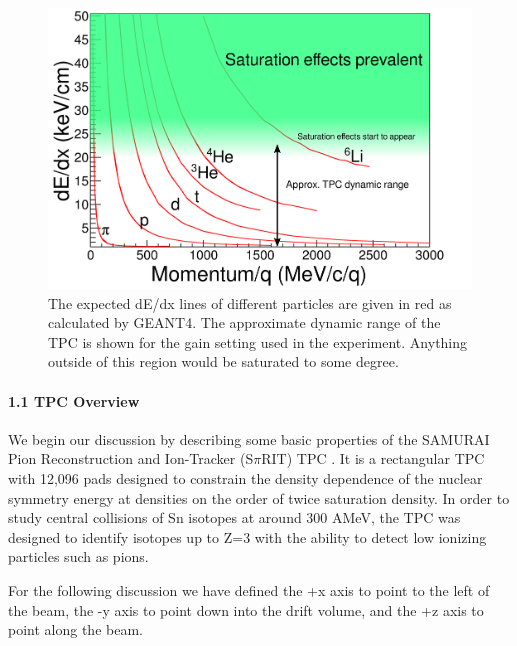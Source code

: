 \documentclass[review]{elsarticle}
\begin{document}
 
 
\begin{figure}[H]
\includegraphics[width=\linewidth]{intrographic}
\caption{The expected dE/dx lines of different particles are given in red as calculated by GEANT4. The approximate dynamic range of the TPC is shown for the gain setting used in the experiment. Anything outside of this region would be saturated to some degree.}
\label{fig:intro}
\end{figure}

\paragraph{1.1 TPC Overview}
We begin our discussion by describing some basic properties of the SAMURAI Pion Reconstruction and Ion-Tracker (S$\pi$RIT) TPC \citep{shane}. It is a rectangular TPC with 12,096 pads designed to constrain the density dependence of the nuclear symmetry energy at densities on the order of twice saturation density. In order to study central collisions of Sn isotopes at around 300 AMeV, the TPC was designed to identify isotopes up to Z=3 with the ability to detect low ionizing particles such as pions. 

 For the following discussion we have defined the +x axis to point to the left of the beam, the -y axis to point down into the drift volume, and the +z axis to point along the beam. 
\end{document}
